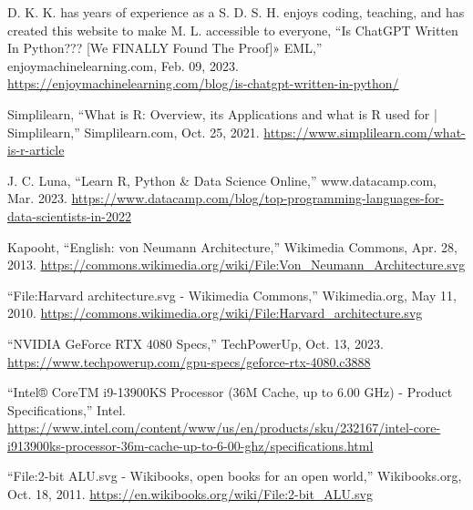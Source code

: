 \documentclass[12pt]{report} %
\begin{document}
\begin{singlespace}
\begin{thebibliography}{}
             D. K. K. has years of experience as a S. D. S. H. enjoys coding, teaching, and has created this website to make M. L. accessible to everyone, “Is ChatGPT Written In Python??? [We FINALLY Found The Proof]» EML,” enjoymachinelearning.com, Feb. 09, 2023. \href{https://enjoymachinelearning.com/blog/is-chatgpt-written-in-python/}{https://enjoymachinelearning.com/blog/is-chatgpt-written-in-python/}

             Simplilearn, “What is R: Overview, its Applications and what is R used for | Simplilearn,” Simplilearn.com, Oct. 25, 2021. \href{https://www.simplilearn.com/what-is-r-article}{https://www.simplilearn.com/what-is-r-article}

             J. C. Luna, “Learn R, Python \& Data Science Online,” www.datacamp.com, Mar. 2023. \href{https://www.datacamp.com/blog/top-programming-languages-for-data-scientists-in-2022}{https://www.datacamp.com/blog/top-programming-languages-for-data-scientists-in-2022}

             Kapooht, “English: von Neumann Architecture,” Wikimedia Commons, Apr. 28, 2013. \href{https://commons.wikimedia.org/wiki/File:Von_Neumann_Architecture.svg}{https://commons.wikimedia.org/wiki/File:Von\_Neumann\_Architecture.svg}

             “File:Harvard architecture.svg - Wikimedia Commons,” Wikimedia.org, May 11, 2010. \href{https://commons.wikimedia.org/wiki/File:Harvard_architecture.svg}{https://commons.wikimedia.org/wiki/File:Harvard\_architecture.svg}

             “NVIDIA GeForce RTX 4080 Specs,” TechPowerUp, Oct. 13, 2023. \href{https://www.techpowerup.com/gpu-specs/geforce-rtx-4080.c3888}{https://www.techpowerup.com/gpu-specs/geforce-rtx-4080.c3888}

             “Intel® CoreTM i9-13900KS Processor (36M Cache, up to 6.00 GHz) - Product Specifications,” Intel. \href{https://www.intel.com/content/www/us/en/products/sku/232167/intel-core-i913900ks-processor-36m-cache-up-to-6-00-ghz/specifications.html}{https://www.intel.com/content/www/us/en/products/sku/232167/intel-core-i913900ks-processor-36m-cache-up-to-6-00-ghz/specifications.html}

             “File:2-bit ALU.svg - Wikibooks, open books for an open world,” Wikibooks.org, Oct. 18, 2011. \href{https://en.wikibooks.org/wiki/File:2-bit_ALU.svg}{https://en.wikibooks.org/wiki/File:2-bit\_ALU.svg}


\end{thebibliography}
\end{singlespace}
\end{document}
